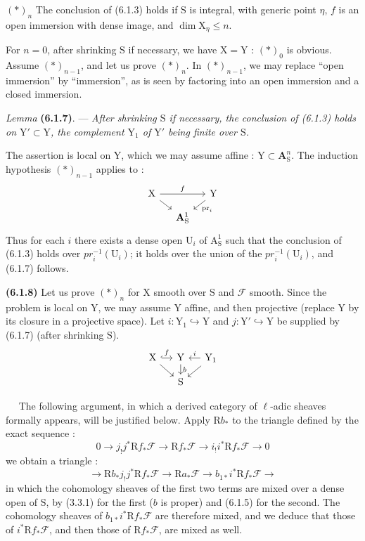 \documentclass[11pt,leqno]{article}
\newcommand{\Page}[1]{\ifvmode\noindent\else\unskip\ \fi{\footnotesize\textcolor{gray}{[p.\,#1]}}\ \ignorespaces}
\begin{document}
\((*)_n\) The conclusion of (6.1.3) holds if \(\mathrm{S}\) is
integral, with generic point \(\eta\), \(f\) is an open
immersion with dense image, and \(\dim\mathrm{X}_\eta\leq n\).

For \(n=0\), after shrinking \(\mathrm{S}\) if necessary, we have
\(\mathrm{X}=\mathrm{Y}\) : \((*)_0\) is obvious. Assume
\((*)_{n-1}\), and let us prove \((*)_n\). In \((*)_{n-1}\), we may
replace “open immersion” by “immersion”, as is seen
by factoring into an open immersion and a closed immersion.

\textit{Lemma} \textbf{(6.1.7)}. — \textit{After shrinking
\(\mathrm{S}\) if necessary, the conclusion of \textup{(6.1.3)} holds on
\(\mathrm{Y}'\subset\mathrm{Y}\), the complement \(\mathrm{Y}_1\)
of \(\mathrm{Y}'\) being finite over \(\mathrm{S}\).}

The assertion is local on \(\mathrm{Y}\), which we may assume
affine : \(\mathrm{Y}\subset\mathbf{A}_{\mathrm{S}}^n\).
The induction hypothesis \((*)_{n-1}\) applies to :
\[
\begin{tikzcd}[column sep=small,row sep=small]
\mathrm{X} \arrow[rr,"f"] \arrow[dr] &&
\mathrm{Y} \arrow[dl,"\mathrm{pr}_i"] \\
& \mathbf{A}_{\mathrm{S}}^1 &
\end{tikzcd}
\]
Thus for each \(i\) there exists a dense open \(\mathrm{U}_i\)
of \(\mathrm{A}_{\mathrm{S}}^1\) such that the conclusion of (6.1.3)
holds over \(\mathit{pr}_i^{-1}(\mathrm{U}_i)\); it holds
over the union of the \(\mathit{pr}_i^{-1}(\mathrm{U}_i)\),
and (6.1.7) follows.

\textbf{(6.1.8)} Let us prove \((*)_n\) for \(\mathrm{X}\) smooth over
\(\mathrm{S}\) and \(\mathscr{F}\) smooth. Since the problem is local
on \(\mathrm{Y}\), we may assume \(\mathrm{Y}\) affine, and then
projective (replace \(\mathrm{Y}\) by its closure in a projective
space). Let \(i:\mathrm{Y}_1\hookrightarrow\mathrm{Y}\) and
\(j:\mathrm{Y}'\hookrightarrow\mathrm{Y}\) be supplied by (6.1.7)
(after shrinking \(\mathrm{S}\)).
\[
\begin{tikzcd}[column sep=small,row sep=small]
\mathrm{X} \arrow[r,hook,"f"] \arrow[dr] &
\mathrm{Y} \arrow[d,"b"] &
\mathrm{Y}_1 \arrow[l,"i"'] \arrow[dl] \\
& \mathrm{S} &
\end{tikzcd}
\]

\Page{245}
The following argument, in which a derived category
of \(\ell\)-adic sheaves formally appears, will be justified below.
Apply \(\mathrm{R}b_*\) to the triangle defined by the exact sequence :
\[
\tag*{(1)}
0\to j_!j^*\mathrm{R}f_*\mathscr{F}
\to\mathrm{R}f_*\mathscr{F}
\to i_!i^*\mathrm{R}f_*\mathscr{F}\to0
\]
we obtain a triangle :
\[
\tag*{(2)}
\to\mathrm{R}b_*j_!j^*\mathrm{R}f_*\mathscr{F}
\to\mathrm{R}a_*\mathscr{F}
\to b_{1*}i^*\mathrm{R}f_*\mathscr{F}\to
\]
in which the cohomology sheaves of the first two terms
are mixed over a dense open of \(\mathrm{S}\), by (3.3.1)
for the first (\(b\) is proper) and (6.1.5) for the second.
The cohomology sheaves of \(b_{1*}i^*\mathrm{R}f_*\mathscr{F}\)
are therefore mixed, and we deduce that those of
\(i^*\mathrm{R}f_*\mathscr{F}\), and then those of
\(\mathrm{R}f_*\mathscr{F}\), are mixed as well.
\end{document}
